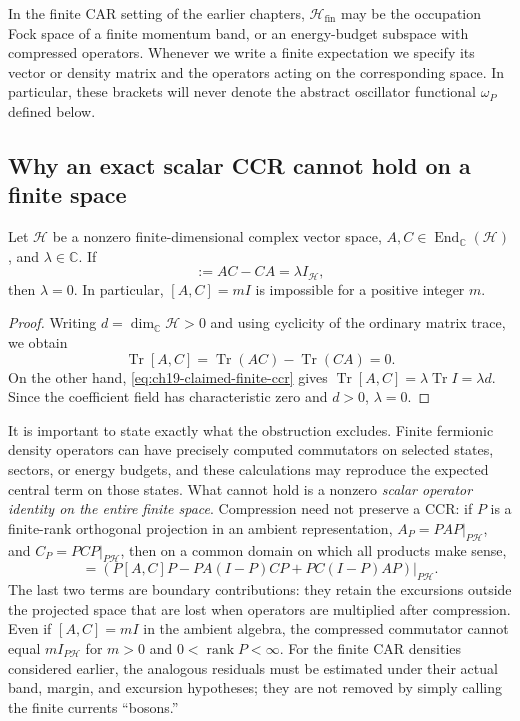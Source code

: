 In the finite CAR setting of the earlier chapters,
$\mathcal H_{\mathrm{fin}}$ may be the occupation Fock space of a finite
momentum band, or an energy-budget subspace with compressed operators.
Whenever we write a finite expectation we specify its vector or density
matrix and the operators acting on the corresponding space.  In particular,
these brackets will never denote the abstract oscillator functional
$\omega_P$ defined below.

\subsection{Why an exact scalar CCR cannot hold on a finite space}

\begin{proposition}
\label{prop:ch19-trace-obstruction}
Let $\mathcal H$ be a nonzero finite-dimensional complex vector space,
$A,C\in\operatorname{End}_{\mathbb C}(\mathcal H)$, and
$\lambda\in\mathbb C$.  If
\begin{equation}
  [A,C]:=AC-CA=\lambda I_{\mathcal H},
  \label{eq:ch19-claimed-finite-ccr}
\end{equation}
then $\lambda=0$.  In particular, $[A,C]=mI$ is impossible for a
positive integer $m$.
\end{proposition}
\begin{proof}
Writing $d=\dim_{\mathbb C}\mathcal H>0$ and using cyclicity of the
ordinary matrix trace, we obtain
\[
 \operatorname{Tr}[A,C]
   =\operatorname{Tr}(AC)-\operatorname{Tr}(CA)=0.
\]
On the other hand, \eqref{eq:ch19-claimed-finite-ccr} gives
$\operatorname{Tr}[A,C]=\lambda\operatorname{Tr}I=\lambda d$.
Since the coefficient field has characteristic zero and $d>0$,
$\lambda=0$.
\end{proof}

It is important to state exactly what the obstruction excludes.  Finite
fermionic density operators can have precisely computed commutators on
selected states, sectors, or energy budgets, and these calculations may
reproduce the expected central term on those states.  What cannot hold is
a nonzero \emph{scalar operator identity on the entire finite space}.
Compression need not preserve a CCR: if $P$ is a finite-rank orthogonal
projection in an ambient representation, $A_P=PAP|_{P\mathcal H}$, and
$C_P=PCP|_{P\mathcal H}$, then on a common domain on which all products
make sense,
\begin{equation}
 [A_P,C_P]
 =\left(P[A,C]P-PA(I-P)CP+PC(I-P)AP\right)|_{P\mathcal H}.
 \label{eq:ch19-compression-remainder}
\end{equation}
The last two terms are boundary contributions: they retain the excursions
outside the projected space that are lost when operators are multiplied
after compression.  Even if $[A,C]=mI$ in the ambient algebra, the
compressed commutator cannot equal $mI_{P\mathcal H}$ for $m>0$ and
$0<\operatorname{rank}P<\infty$.  For the finite CAR densities considered
earlier, the analogous residuals must be estimated under their actual
band, margin, and excursion hypotheses; they are not removed by simply
calling the finite currents ``bosons.''

